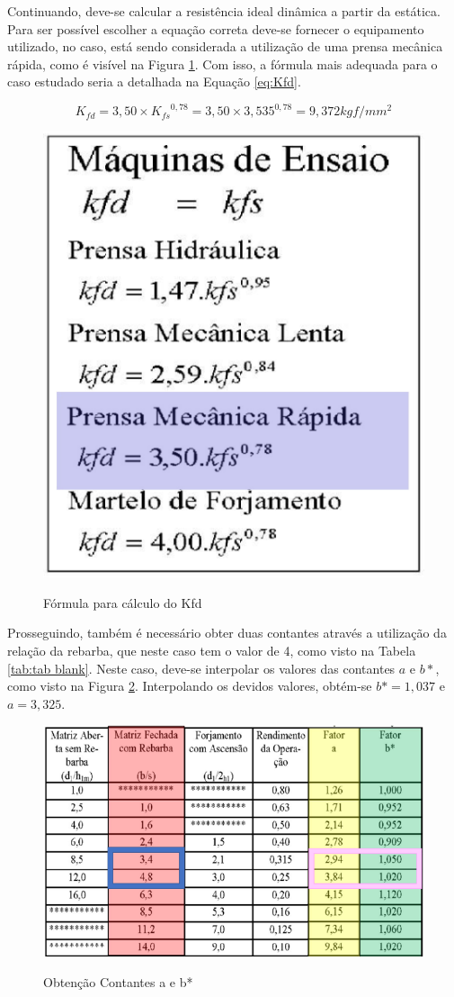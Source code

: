 \documentclass[deposito, acronym, symbols]{fei}
\begin{document}
Continuando, deve-se calcular a resistência ideal dinâmica a partir da estática. Para ser possível escolher a equação correta deve-se fornecer o equipamento utilizado, no caso, está sendo considerada a utilização de uma prensa mecânica rápida, como é visível na Figura \ref{fig:Kfd}. Com isso, a fórmula mais adequada para o caso estudado seria a detalhada na Equação \ref{eq:Kfd}.

\begin{equation}
    \label{eq:Kfd}
    K_{fd}= 3,50 \times {K_{fs}}^{0,78}=3,50 \times 3,535^{0,78}=9,372kgf/mm^2
\end{equation} 

\begin{figure}[!htp]
    \centering
    \caption{Fórmula para cálculo do Kfd}
    \includegraphics[width=0.3\linewidth]{Imagens/Kfd.png}
    \label{fig:Kfd}
\end{figure}

Prosseguindo, também é necessário obter duas contantes através a utilização da relação da rebarba, que neste caso tem o valor de 4, como visto na Tabela \ref{tab:tab blank}. Neste caso, deve-se interpolar os valores das contantes $a$ e $b*$, como visto na Figura \ref{fig:ConstantesAB}. Interpolando os devidos valores, obtém-se $b*=1,037$ e $a=3,325$.

\begin{figure}[!htp]
    \centering
    \caption{Obtenção Contantes a e b*}
    \includegraphics[width=0.6\linewidth]{Imagens/Constantes_AB.png}
    \label{fig:ConstantesAB}
\end{figure}    
\end{document}
